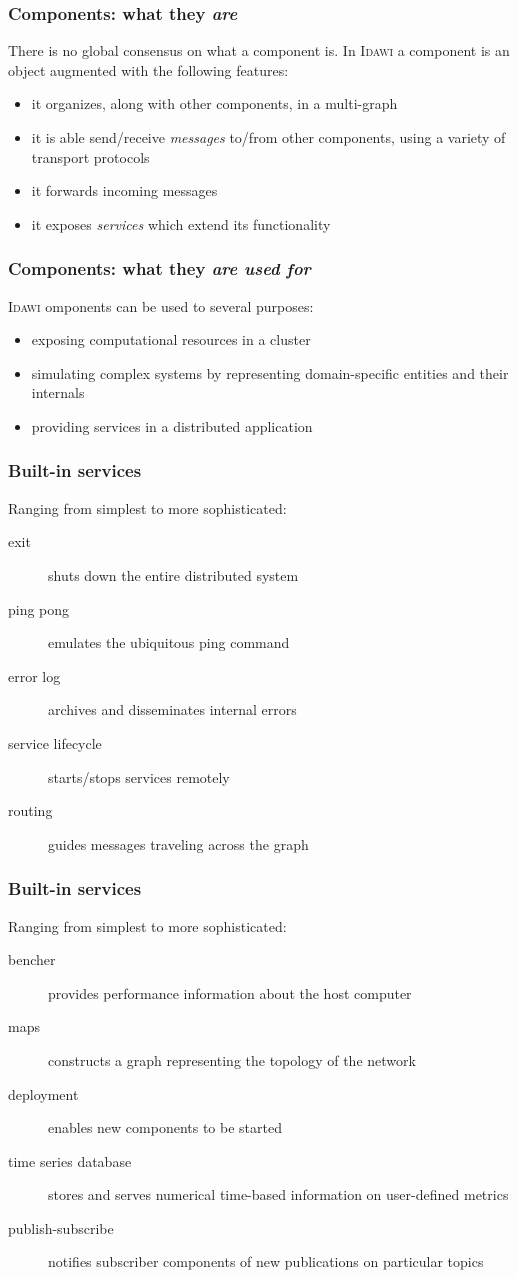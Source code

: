 \documentclass[11pt]{beamer}
\newcommand{\idawi}[1]{\textsc{Idawi}\xspace}
\begin{document}
\begin{frame}
\frametitle{Components: what they \emph{are}}
There is no global consensus on what a component is. In \idawi, a component is an object augmented with the following features:
\begin{itemize}
	\item it organizes, along with other components, in a multi-graph
	\item it is able send/receive \emph{messages} to/from other components, using a variety of transport protocols
	\item it forwards incoming messages
	\item it exposes \emph{services} which extend its  functionality
\end{itemize}
\end{frame}


\begin{frame}
\frametitle{Components: what they \emph{are used for}}
\idawi components can be used to several purposes:
\begin{itemize}
	\item exposing computational resources in a cluster
	\item simulating complex systems by representing domain-specific entities and their internals
	\item providing services in a distributed application
\end{itemize}
\end{frame}


\begin{frame}
\frametitle{Built-in services}
Ranging from simplest to more sophisticated:
\begin{description}
	\item[exit] shuts down the entire distributed system
	\item[ping pong] emulates the ubiquitous ping command
	\item[error log] archives and disseminates internal errors
	\item[service lifecycle] starts/stops services remotely
	\item[routing] guides messages traveling across the  graph
\end{description}
\end{frame}


\begin{frame}
\frametitle{Built-in services}
Ranging from simplest to more sophisticated:
\begin{description}
	\item[bencher] provides performance information about the host computer
	\item[maps]  constructs a graph representing the topology of the network
	\item[deployment] enables new components to be started 
	\item[time series database] stores and serves numerical time-based information on user-defined metrics
	\item[publish-subscribe] notifies subscriber components of new publications on particular topics
\end{description}
\end{frame}
\end{document}
